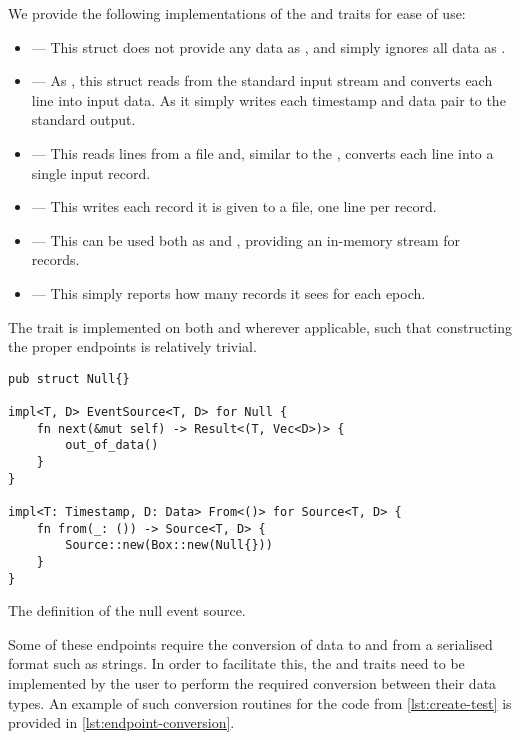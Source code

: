 We provide the following implementations of the  and  traits for ease of use:

\begin{itemize}
\item {} --- This struct does not provide any data as , and simply ignores all data as .
\item {} --- As , this struct reads from the standard input stream and converts each line into input data. As  it simply writes each timestamp and data pair to the standard output.
\item {} --- This  reads lines from a file and, similar to the , converts each line into a single input record.
\item {} --- This  writes each record it is given to a file, one line per record.
\item {} --- This can be used both as  and , providing an in-memory stream for records.
\item {} --- This  simply reports how many records it sees for each epoch.
\end{itemize}

The  trait is implemented on both  and  wherever applicable, such that constructing the proper endpoints is relatively trivial. \\

\begin{listing}[H]
\begin{verbatim}
pub struct Null{}

impl<T, D> EventSource<T, D> for Null {
    fn next(&mut self) -> Result<(T, Vec<D>)> {
        out_of_data()
    }
}

impl<T: Timestamp, D: Data> From<()> for Source<T, D> {
    fn from(_: ()) -> Source<T, D> {
        Source::new(Box::new(Null{}))
    }
}
\end{verbatim}
  \caption{The definition of the null event source.}
  \label{lst:null-endpoint}
\end{listing}

Some of these endpoints require the conversion of data to and from a serialised format such as strings. In order to facilitate this, the  and  traits need to be implemented by the user to perform the required conversion between their data types. An example of such conversion routines for the code from \autoref{lst:create-test} is provided in \autoref{lst:endpoint-conversion}.


